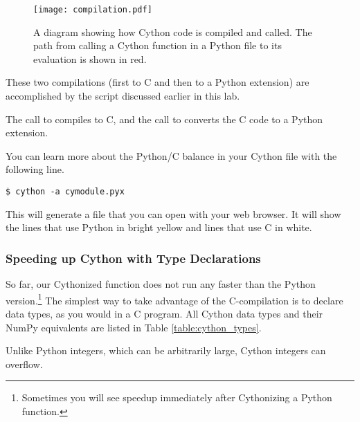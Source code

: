\begin{figure}
\centering
\texttt{[image: compilation.pdf]}
\caption{A diagram showing how Cython code is compiled and called.
The path from calling a Cython function in a Python file to its evaluation is shown in red.}
\label{cython:compilation}
\end{figure}

These two compilations (first to C and then to a Python extension) are accomplished by the script  discussed earlier in this lab.

The call to  compiles  to C, and the call to  converts the C code to a Python extension.

\begin{info}
You can learn more about the Python/C balance in your Cython file with the following line.
\begin{lstlisting}
$ cython -a cymodule.pyx
\end{lstlisting}
This will generate a  file that you can open with your web browser.
It will show the lines that use Python in bright yellow and lines that use C in white.
\end{info}

\subsubsection*{Speeding up Cython with Type Declarations}
So far, our Cythonized  function does not run any faster than the Python version.\footnote{Sometimes you will see speedup immediately after Cythonizing a Python function.}
The simplest way to take advantage of the C-compilation is to declare data types, as you would in a C program.
All Cython data types and their NumPy equivalents are listed in Table \ref{table:cython_types}.

\begin{warn}
Unlike Python integers, which can be arbitrarily large, Cython integers can overflow.
\end{warn}

